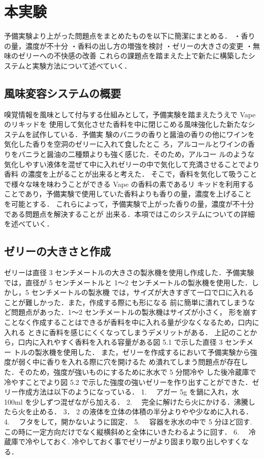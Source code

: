 \section{本実験}
予備実験より上がった問題点をまとめたものを以下に簡潔にまとめる．
・香りの量，濃度が不十分
・香料の出し方の増強を検討
・ゼリーの大きさの変更
・無味のゼリーへの不快感の改善
これらの課題点を踏まえた上で新たに構築したシステムと実験方法について述べていく．


\subsection{風味変容システムの概要}

嗅覚情報を風味として付与する仕組みとして，予備実験を踏まえたうえで Vape のリキッドを
使用して気化させた香料を中に閉じこめる風味強化した新たなシステムを試作している．予備実
験のバニラの香りと醤油の香りの他にワインを気化した香りを空洞のゼリーに入れて食したとこ
ろ，アルコールとワインの香りをバニラと醤油の二種類よりも強く感じた．そのため，アルコー
ルのような気化しやすい液体を混ぜて中に入れゼリーの中で気化して充満させることでより香料
の濃度を上がることが出来ると考えた．
そこで，香料を気化して吸うことで様々な味を味わうことができる Vape の香料の素であるリ
キッドを利用することであり，予備実験で使用していた香料よりも香りの量，濃度を上げること
を可能とする．
これらによって，予備実験で上がった香りの量，濃度が不十分である問題点を解決することが
出来る．本項ではこのシステムについての詳細を述べていく．


\subsection{ゼリーの大きさと作成}

ゼリーは直径 3 センチメートルの大きさの製氷機を使用し作成した．予備実験では，直径が 5
センチメートルと 1～2 センチメートルの製氷機を使用した．しかし，5 センチメートルの製氷機
では，サイズが大きすぎて一口で口に入れることが難しかった．また，作成する際にも形になる
前に簡単に潰れてしまうなど問題点があった．1～2 センチメートルの製氷機はサイズが小さく，
形を崩すことなく作成することはできるが香料を中に入れる量が少なくなるため，口内に入れる
ときに香料を感じにくくなってしまうデメリットがある．
上記のことから，口内に入れやすく香料を入れる容量がある図 5.1 で示した直径 3 センチメー
トルの製氷機を使用した．
また，ゼリーを作成するにおいて予備実験から強度が弱く中に香りを入れる際に穴を開けるた
め潰れてしまう問題点が存在した．そのため，強度が強いものにするために氷水で 5 分間冷や
した後冷蔵庫で冷やすことでより図 5.2 で示した強度の強いゼリーを作り出すことができた．ゼ
リー作成方法は以下のようになっている．
1. 　アガー 5g を鍋に入れ，水 100ml を少しずつ混ぜながら加える．
2. 　完全に解けたら火にかける．沸騰したら火を止める．
3． 2 の液体を立体の体積の半分よりやや少なめに入れる．
4. 　フタをして，開かないように固定．
5. 　容器を氷水の中で 5 分ほど回す. この時に一定方向だけでなく縦横斜めと全体にいきたわるように回す．
6. 　冷蔵庫で冷やしておく. 冷やしておく事でゼリーがより固まり取り出しやすくなる．


